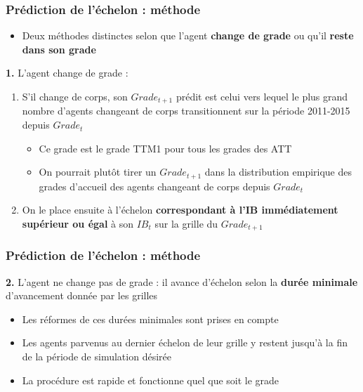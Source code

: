 \documentclass[xcolor=table,ignorenonframetext,12pt]{beamer}
\begin{document}
\begin{frame}
\frametitle{Prédiction de l'échelon : méthode}
\begin{itemize}
\item Deux méthodes distinctes selon que l'agent \textbf{change de grade} ou qu'il \textbf{reste dans son grade}
\end{itemize}

	\textbf{1.} L'agent change de grade : \\
	\begin{enumerate}
	\item S'il change de corps, son $Grade_{t+1}$ prédit est celui vers lequel le plus grand nombre d'agents changeant de corps transitionnent sur la période 2011-2015 depuis $Grade_{t}$\\
	\begin{footnotesize}
		\begin{itemize}
		\item Ce grade est le grade TTM1 pour tous les grades des ATT 
		\item On pourrait plutôt tirer un $Grade_{t+1}$ dans la distribution empirique des grades d'accueil des agents changeant de corps depuis $Grade_{t}$
	\end{itemize}
	\end{footnotesize}
	\item On le place ensuite à l'échelon \textbf{correspondant à l'IB immédiatement supérieur ou égal} à son $IB_t$ sur la grille du $Grade_{t+1}$ 
	\end{enumerate}
	
	

\end{frame}

\begin{frame}
\frametitle{Prédiction de l'échelon : méthode}


	\textbf{2.}  L'agent ne change pas de grade : il avance d'échelon selon la \textbf{durée minimale} d'avancement donnée par les grilles\\
	\begin{itemize}
		\item Les réformes de ces durées minimales sont prises en compte
\begin{itemize}
\end{itemize}
		\item Les agents parvenus au dernier échelon de leur grille y restent jusqu'à la fin de la période de simulation désirée
		\item La procédure est rapide et fonctionne quel que soit le grade
	\end{itemize}

	

\end{frame}
\end{document}
